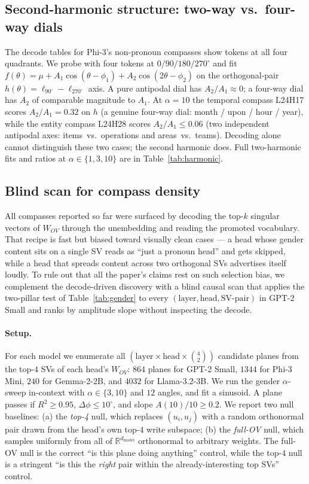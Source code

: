 \subsection{Second-harmonic structure: two-way vs.\ four-way dials}
\label{sec:harmonic}

The decode tables for Phi-3's non-pronoun compasses show tokens at all
four quadrants. We probe with four tokens at
$0/90/180/270^\circ$ and fit $f(\theta) = \mu + A_1\cos(\theta - \phi_1)
+ A_2\cos(2\theta - \phi_2)$ on the orthogonal-pair
$h(\theta) = \ell_{90^\circ}-\ell_{270^\circ}$ axis. A pure antipodal
dial has $A_2/A_1 \approx 0$; a four-way dial has $A_2$ of
comparable magnitude to $A_1$. At $\alpha=10$ the temporal compass L24H17
scores $A_2/A_1 = 0.32$ on $h$ (a genuine four-way dial:
month / upon / hour / year), while the entity compass L24H28 scores
$A_2/A_1 \le 0.06$ (two independent antipodal axes:
items~vs.\ operations and areas~vs.\ teams). Decoding alone cannot
distinguish these two cases; the second harmonic does. Full
two-harmonic fits and ratios at $\alpha\in\{1,3,10\}$ are in
Table~\ref{tab:harmonic}.

\subsection{Blind scan for compass density}
\label{sec:scan}

All compasses reported so far were surfaced by decoding the top-$k$
singular vectors of $W_{OV}$ through the unembedding and reading the
promoted vocabulary. That recipe is fast but biased toward visually
clean cases --- a head whose gender content sits on a single SV reads
as ``just a pronoun head'' and gets skipped, while a head that spreads
content across two orthogonal SVs advertises itself loudly. To rule
out that all the paper's claims rest on such selection bias, we
complement the decode-driven discovery with a blind causal scan that
applies the two-pillar test of Table~\ref{tab:gender} to every
$(\text{layer}, \text{head}, \text{SV-pair})$ in GPT-2 Small and ranks
by amplitude slope without inspecting the decode.

\paragraph{Setup.} For each model we enumerate all
$(\text{layer} \times \text{head} \times \binom{4}{2})$ candidate planes
from the top-$4$ SVs of each head's $W_{OV}$: $864$ planes for GPT-2
Small, $1344$ for Phi-3 Mini, $240$ for Gemma-2-2B, and $4032$ for
Llama-3.2-3B. We run the gender $\alpha$-sweep in-context with
$\alpha \in \{3, 10\}$ and $12$ angles, and fit a sinusoid. A plane passes
if $R^2 \ge 0.95$, $\Delta\phi \le 10^\circ$, and slope $A(10)/10 \ge 0.2$.
We report two null baselines: (a) the \emph{top-4} null, which replaces
$(u_i, u_j)$ with a random orthonormal pair drawn from the head's own
top-$4$ write subspace; (b) the \emph{full-OV} null, which samples
uniformly from all of $\mathbb{R}^{d_{\text{model}}}$ orthonormal to
arbitrary weights. The full-OV null is the correct ``is this plane
doing anything'' control, while the top-$4$ null is a stringent
``is this the \emph{right} pair within the already-interesting top
SVs'' control.

